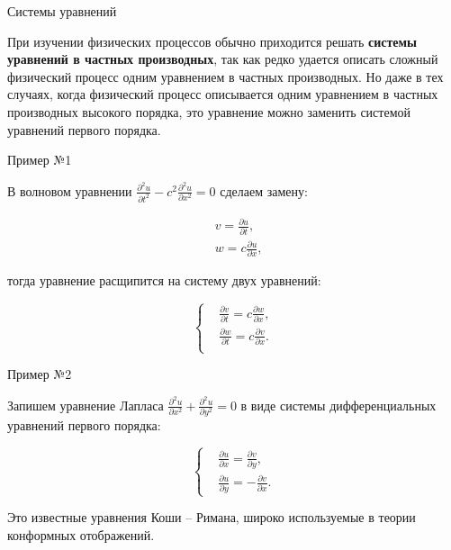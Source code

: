 \documentclass[10pt,xcolor=pst,aspectratio=169]{beamer}
\begin{document}
\begin{frame}{Системы уравнений}

	\transdissolve[duration=0.1]
	\justifying
	\large

	При изучении физических процессов обычно приходится решать \textbf{системы уравнений в частных производных}, так как редко удается описать сложный физический процесс одним уравнением в частных производных. Но даже в тех случаях, когда физический процесс описывается одним уравнением в частных производных высокого порядка, это уравнение можно заменить системой уравнений первого порядка.

\end{frame}

\begin{frame}{Пример №1}

	\transdissolve[duration=0.1]
	\justifying
	\large

	В волновом уравнении $\frac{\partial^{2} u}{\partial t^{2}} - c^{2} \frac{\partial^{2} u}{\partial x^{2}} = 0$ сделаем замену:

	\[
		\begin{split}
			&v = \frac{\partial u}{\partial t},\\
			&w = c \frac{\partial u}{\partial x},
		\end{split}
	\]

	тогда уравнение расщипится на систему двух уравнений:

	\[
		\begin{cases}
			&\frac{\partial v}{\partial t} = c \frac{\partial w}{\partial x}, \\
			&\frac{\partial w}{\partial t} = c \frac{\partial v}{\partial x}. \\
		\end{cases}
	\]
	
\end{frame}

\begin{frame}{Пример №2}

	\transdissolve[duration=0.1]
	\justifying
	\large

	Запишем уравнение Лапласа $\frac{\partial^{2} u}{\partial x^{2}} + \frac{\partial^{2} u}{\partial y^{2}} = 0$ в виде системы дифференциальных уравнений первого порядка:

	\[
		\begin{cases}
			&\frac{\partial u}{\partial x} = \frac{\partial v}{\partial y},\\
			&\frac{\partial u}{\partial y} = -\frac{\partial v}{\partial x}.
		\end{cases}
	\]

	Это известные уравнения Коши -- Римана, широко используемые в теории конформных отображений.

\end{frame}
\end{document}
